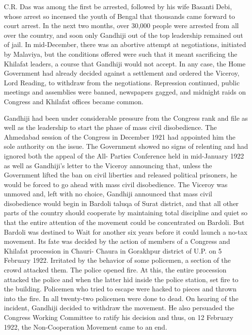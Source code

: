 C.R. Das was among the first be arrested, followed by his wife Basanti Debi, whose arrest so incensed the youth of Bengal that thousands came forward to court arrest. In the next two months, over 30,000 people were arrested from all over the country, and soon only Gandhiji out of the top leadership remained out of jail. In mid-December, there was an abortive attempt at negotiations, initiated by Malaviya, but the conditions offered were such that it meant sacrificing the Khilafat leaders, a course that Gandhiji would not accept. In any case, the Home Government had already decided against a settlement and ordered the Viceroy, Lord Reading, to withdraw from the negotiations. Repression continued, public meetings and assemblies were banned, newspapers gagged, and midnight raids on Congress and Khilafat offices became common. 

Gandhiji had been under considerable pressure from the Congress rank and file as well as the leadership to start the phase of mass civil disobedience. The Ahmedabad session of the Congress in December 1921 had appointed him the sole authority on the issue. The Government showed no signs of relenting and had ignored both the appeal of the All- Parties Conference held in mid-January 1922 as well as Gandhiji's letter to the Viceroy announcing that, unless the Government lifted the ban on civil liberties and released political prisoners, he would be forced to go ahead with mass civil disobedience. The Viceroy was unmoved and, left with no choice, Gandhiji announced that mass civil disobedience would begin in Bardoli taluqa of Surat district, and that all other parts of the country should cooperate by maintaining total discipline and quiet so that the entire attention of the movement could be concentrated on Bardoli. But Bardoli was destined to Wait for another six years before it could launch a no-tax movement. Its fate was decided by the action of members of a Congress and Khilafat procession in Chauri- Chaura in Gorakhpur district of U.P. on 5 February 1922. Irritated by the behavior of some policemen, a section of the crowd attacked them. The police opened fire. At this, the entire procession attacked the police and when the latter hid inside the police station, set fire to the building. Policemen who tried to escape were hacked to pieces and thrown into the fire. In all twenty-two policemen were done to dead. On hearing of the incident, Gandhiji decided to withdraw the movement. He also persuaded the Congress Working Committee to ratify his decision and thus, on 12 February 1922, the Non-Cooperation Movement came to an end. 

